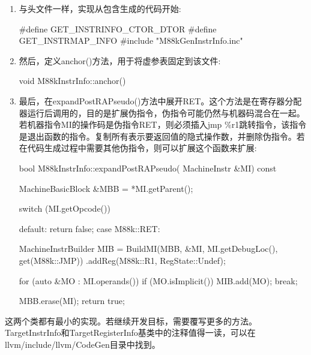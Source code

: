\begin{enumerate}
\item
与头文件一样，实现从包含生成的代码开始:

\begin{cpp}
#define GET_INSTRINFO_CTOR_DTOR
#define GET_INSTRMAP_INFO
#include "M88kGenInstrInfo.inc"
\end{cpp}

\item
然后，定义anchor()方法，用于将虚参表固定到该文件:

\begin{cpp}
void M88kInstrInfo::anchor() {}
\end{cpp}

\item
最后，在expandPostRAPseudo()方法中展开RET。这个方法是在寄存器分配器运行后调用的，目的是扩展伪指令，伪指令可能仍然与机器码混合在一起。若机器指令MI的操作码是伪指令RET，则必须插入jmp \%r1跳转指令，该指令是退出函数的指令。复制所有表示要返回值的隐式操作数，并删除伪指令。若在代码生成过程中需要其他伪指令，则可以扩展这个函数来扩展:

\begin{cpp}
bool M88kInstrInfo::expandPostRAPseudo(
        MachineInstr &MI) const {
    MachineBasicBlock &MBB = *MI.getParent();

    switch (MI.getOpcode()) {
        default:
            return false;
        case M88k::RET: {
            MachineInstrBuilder MIB =
            BuildMI(MBB, &MI, MI.getDebugLoc(),
                    get(M88k::JMP))
                .addReg(M88k::R1, RegState::Undef);

            for (auto &MO : MI.operands()) {
                if (MO.isImplicit())
                    MIB.add(MO);
            }
            break;
    }
    }
    MBB.erase(MI);
    return true;
}
\end{cpp}

\end{enumerate}

这两个类都有最小的实现。若继续开发目标，需要覆写更多的方法。TargetInstrInfo和TargetRegisterInfo基类中的注释值得一读，可以在llvm/include/llvm/CodeGen目录中找到。

